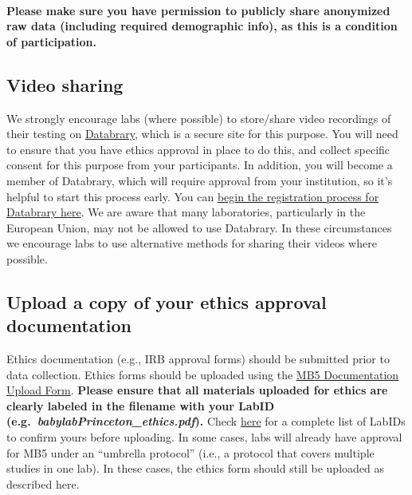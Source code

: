 \documentclass[
]{book}
\begin{document}
\hypertarget{please-make-sure-you-have-permission-to-publicly-share-anonymized-raw-data-including-required-demographic-info-as-this-is-a-condition-of-participation.}{%
\paragraph*{Please make sure you have permission to publicly share anonymized raw data (including required demographic info), as this is a condition of participation.}\label{please-make-sure-you-have-permission-to-publicly-share-anonymized-raw-data-including-required-demographic-info-as-this-is-a-condition-of-participation.}}

\hypertarget{video-sharing}{%
\subsection{Video sharing}\label{video-sharing}}

We strongly encourage labs (where possible) to store/share video recordings of their testing on \href{https://nyu.databrary.org/}{Databrary}, which is a secure site for this purpose. You will need to ensure that you have ethics approval in place to do this, and collect specific consent for this purpose from your participants. In addition, you will become a member of Databrary, which will require approval from your institution, so it's helpful to start this process early. You can \href{https://nyu.databrary.org/user/register?page=create}{begin the registration process for Databrary here}. We are aware that many laboratories, particularly in the European Union, may not be allowed to use Databrary. In these circumstances we encourage labs to use alternative methods for sharing their videos where possible.

\hypertarget{ethics-upload}{%
\subsection{Upload a copy of your ethics approval documentation}\label{ethics-upload}}

Ethics documentation (e.g., IRB approval forms) should be submitted prior to data collection. Ethics forms should be uploaded using the \href{https://docs.google.com/forms/d/e/1FAIpQLScTTmcQl1P1F4UWe95Jo7u5bken40AyAefXCYUJ9iYbnWaG8Q/viewform?usp=sf_link}{MB5 Documentation Upload Form}. \textbf{Please ensure that all materials uploaded for ethics are clearly labeled in the filename with your LabID (e.g.~\emph{babylabPrinceton\_ethics.pdf}).} Check \href{https://manybabies.org/labids/}{here} for a complete list of LabIDs to confirm yours before uploading. In some cases, labs will already have approval for MB5 under an ``umbrella protocol'' (i.e., a protocol that covers multiple studies in one lab). In these cases, the ethics form should still be uploaded as described here.
\end{document}
